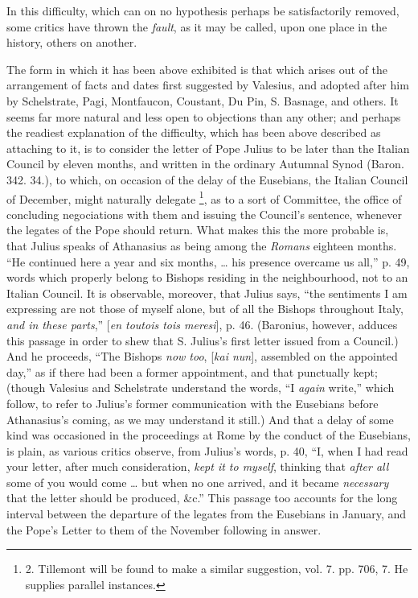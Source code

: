 In this difficulty, which can
on no hypothesis perhaps be satisfactorily removed, some critics have
thrown the \emph{fault}, as it may be called, upon one place in the
history, others on another.

The form in which it has been
above exhibited is that which arises out of the arrangement of facts
and dates first suggested by Valesius, and adopted after him by
Schelstrate, Pagi, Montfaucon, Coustant, Du Pin, S. Basnage, and
others. It seems far more natural and less open to objections than any
other; and perhaps the readiest explanation of the difficulty, which
has been above described as attaching to it, is to consider the letter
of Pope Julius to be later than the Italian Council by eleven months,
and written in the ordinary Autumnal Synod (Baron. 342. 34.), to
which, on occasion of the delay of the Eusebians, the Italian Council
of December, might naturally delegate \footnote{2.
Tillemont will be found to make a similar suggestion, vol. 7. pp. 706,
7. He supplies parallel instances.}, as to a sort of Committee, the office of concluding
negociations with them and issuing the Council's sentence, whenever
the legates of the Pope should return. What makes this the more
probable is, that Julius speaks of Athanasius as being among the \emph{Romans}
eighteen months. “He continued here a year and six months, … his
presence overcame us all,” p. 49, words which properly belong to
Bishops residing in the neighbourhood, not to an Italian Council. It
is observable, moreover, that Julius says, “the sentiments I am
expressing are not those of myself alone, but of all the Bishops
throughout Italy, \emph{and in these parts},” [\emph{en toutois tois
meresi}], p. 46. (Baronius, however, adduces this passage in order
to shew that S. Julius's first letter issued from a Council.) And he
proceeds, “The Bishops \emph{now too}, [\emph{kai nun}], assembled
on the appointed day,” as if there had been a former appointment,
and that punctually kept; (though Valesius and Schelstrate understand
the words, “I \emph{again} write,” which follow, to refer to
Julius's former communication with the Eusebians before Athanasius's
coming, as we may understand it still.) And that a delay of some kind
was occasioned in the proceedings at Rome by the conduct of the
Eusebians, is plain, as various critics observe, from Julius's words,
p. 40, “I, when I had read your letter, after much consideration, \emph{kept
it to myself}, thinking that \emph{after all} some of you would
come … but when no one arrived, and it became \emph{necessary} that
the letter should be produced, \&c.” This passage too accounts
for the long interval between the departure of the legates from the
Eusebians in January, and the Pope's Letter to them of the November
following in answer.

